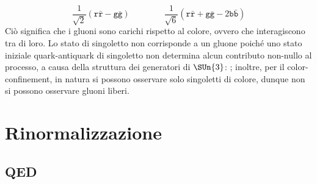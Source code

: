 \begin{equation*}
  \frac{1}{\sqrt{2}} (\mathtt{r}\bar{\mathtt{r}} - \mathtt{g}\bar{\mathtt{g}})
  \qquad \qquad
  \frac{1}{\sqrt{6}} (\mathtt{r}\bar{\mathtt{r}} + \mathtt{g}\bar{\mathtt{g}} - 2 \mathtt{b}\bar{\mathtt{b}})
\end{equation*}
Ciò significa che i gluoni sono carichi rispetto al colore, ovvero che interagiscono tra di loro. Lo stato di singoletto non corrisponde a un gluone poiché uno stato iniziale quark-antiquark di singoletto non determina alcun contributo non-nullo al processo, a causa della struttura dei generatori di $ \SUn{3} $: ; inoltre, per il color-confinement, in natura si possono osservare solo singoletti di colore, dunque non si possono osservare gluoni liberi.

\section{Rinormalizzazione}

\subsection{QED}

